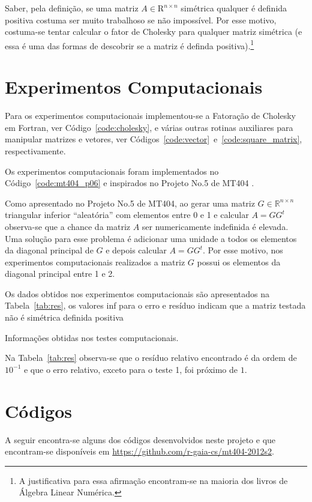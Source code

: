 \documentclass[12pt,a4paper]{article}
\begin{document}
Saber, pela definição, se uma matriz $A \in \mathrm{R}^{n \times n}$ simétrica
qualquer é definida positiva costuma ser muito trabalhoso se não impossível. Por
esse motivo, costuma-se tentar calcular o fator de Cholesky para qualquer matriz
simétrica (e essa é uma das formas de descobrir se a matriz é definda
positiva).\footnote{A justificativa para essa afirmação encontram-se na maioria
dos livros de Álgebra Linear Numérica.}

\section{Experimentos Computacionais}
Para os experimentos computacionais implementou-se a Fatoração de Cholesky em
Fortran, ver Código~\ref{code:cholesky}, e várias outras rotinas auxiliares para
manipular matrizes e vetores, ver
Códigos~\ref{code:vector}~e~\ref{code:square_matrix}, respectivamente.

Os experimentos computacionais foram implementados no
Código~\ref{code:mt404_p06} e inspirados no Projeto No.5 de MT404
\cite{Raniere-2012-MT404Proj05}.

Como apresentado no Projeto No.5 de MT404, ao gerar uma matriz $G \in
\mathbb{R}^{n \times n}$ triangular inferior ``aleatória'' com elementos entre 0
e 1 e calcular $A = G G^t$ observa-se que a chance da matriz $A$ ser
numericamente indefinida é elevada. Uma solução para esse problema é adicionar
uma unidade a todos os elementos da diagonal principal de $G$ e depois calcular
$A = G G^t$. Por esse motivo, nos experimentos computacionais realizados a
matriz $G$ possui os elementos da diagonal principal entre 1 e 2.

Os dados obtidos nos experimentos computacionais são apresentados na
Tabela~\ref{tab:res}, os valores inf para o erro e resíduo indicam que a matriz
testada não é simétrica definida positiva
\begin{table}[!htb]
    \centering
    \caption{Informações obtidas nos testes computacionais.}
    \label{tab:res}
\end{table}

Na Tabela~\ref{tab:res} observa-se que o resíduo relativo encontrado é da ordem
de $10^{-1}$ e que o erro relativo, exceto para o teste 1, foi próximo de $1$.

\section{C\'{o}digos}
A seguir encontra-se alguns dos c\'{o}digos desenvolvidos neste projeto e que
encontram-se disponíveis em \url{https://github.com/r-gaia-cs/mt404-2012s2}.
\end{document}
